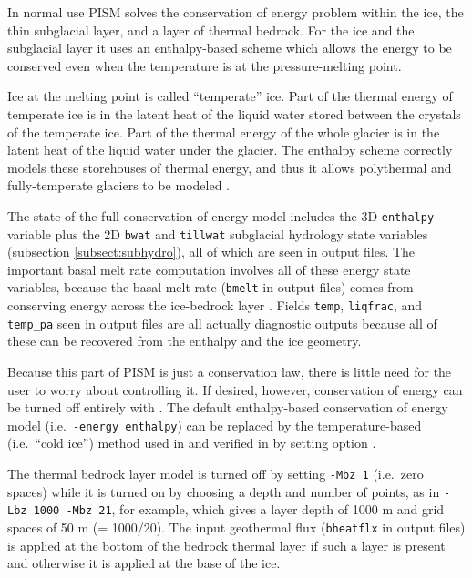 In normal use PISM solves the conservation of energy problem within the ice, the thin subglacial layer, and a layer of thermal bedrock.  For the ice and the subglacial layer it uses an enthalpy-based scheme \cite{AschwandenBuelerKhroulevBlatter} which allows the energy to be conserved even when the temperature is at the pressure-melting point.

Ice at the melting point is called ``temperate'' ice.  Part of the thermal energy of temperate ice is in the latent heat of the liquid water stored between the crystals of the temperate ice.  Part of the thermal energy of the whole glacier is in the latent heat of the liquid water under the glacier.  The enthalpy scheme correctly models these storehouses of thermal energy, and thus it allows polythermal and fully-temperate glaciers to be modeled \cite{AschwandenBlatter}.

The state of the full conservation of energy model includes the 3D \texttt{enthalpy} variable plus the 2D \texttt{bwat} and \texttt{tillwat} subglacial hydrology state variables (subsection \ref{subsect:subhydro}), all of which are seen in output files.  The important basal melt rate computation involves all of these energy state variables, because the basal melt rate (\texttt{bmelt} in output files) comes from conserving energy across the ice-bedrock layer \cite{AschwandenBuelerKhroulevBlatter}.  Fields \texttt{temp}, \texttt{liqfrac}, and \texttt{temp_pa} seen in output files are all actually diagnostic outputs because all of these can be recovered from the enthalpy and the ice geometry.

Because this part of PISM is just a conservation law, there is little need for the user to worry about controlling it.  If desired, however, conservation of energy can be turned off entirely with .  The default enthalpy-based conservation of energy model (i.e.~\texttt{-energy enthalpy}) can be replaced by the temperature-based (i.e.~``cold ice'') method used in \cite{BBssasliding} and verified in \cite{BBL} by setting option .

The thermal bedrock layer model is turned off by setting \texttt{-Mbz 1} (i.e.~zero spaces) while it is turned on by choosing a depth and number of points, as in \texttt{-Lbz 1000 -Mbz 21}, for example, which gives a layer depth of 1000 m and grid spaces of 50 m (= 1000/20).  The input geothermal flux (\texttt{bheatflx} in output files) is applied at the bottom of the bedrock thermal layer if such a layer is present and otherwise it is applied at the base of the ice.


